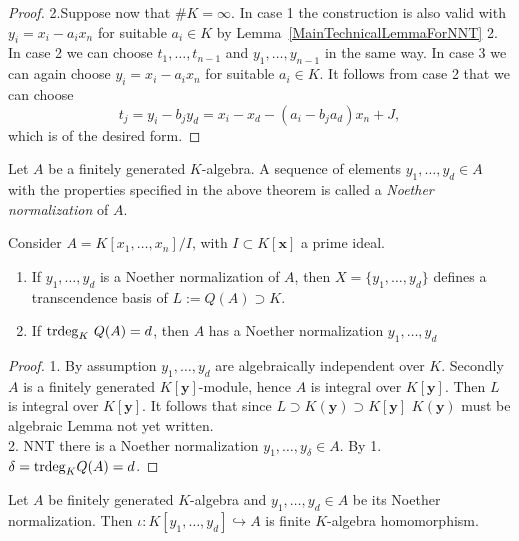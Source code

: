 \begin{proof}
        \noindent 2.Suppose now that $\#K=\infty$. In case 1 the construction is also valid with $y_i =x_i-a_ix_n$ for suitable $a_i\in K$ by Lemma~\ref{MainTechnicalLemmaForNNT} 2.\\ 
        In case 2 we can choose $t_1,\dots, t_{n-1}$ and $y_1,\dots, y_{n-1}$ in the same way. In case 3 we can again choose $y_i = x_i-a_ix_n$ for suitable $a_i\in K$. It follows from case 2 that we can choose $$t_j = y_i-b_jy_d = x_i-x_d-(a_i-b_ja_d)x_n + J,$$ which is of the desired form.  
    \end{proof}
    \begin{definition}
        Let $A$ be a finitely generated $K$-algebra. A sequence of elements $y_1,\dots,y_d \in A$ with the properties specified in the above theorem is called a \textit{Noether normalization} of $A$. 
    \end{definition}
    \begin{corollary}\label{FinitelyGeneratedFieldAlgebrasHaveFiniteTranscendenceDegree}
        Consider $A = K[x_1,\dots,x_n]/I$, with $I\subset K[\mathbf{x}]$ a prime ideal.
        \begin{enumerate}
            \item  If $y_1,\dots,y_d$ is a Noether normalization of $A$, then $X=\{y_1,\dots, y_d\}$ defines a transcendence basis of $L:=Q(A)\supset K$.
            \item If $\mathrm{trdeg }_K\ Q(A)=d$, then $A$ has a Noether normalization $y_1,\dots, y_d$
        \end{enumerate} 
    \end{corollary}
    \begin{proof}
        1. By assumption $y_1,\dots,y_d$ are algebraically independent over $K$. Secondly $A$ is a finitely generated $K[\mathbf{y}]$-module, hence $A$ is integral over $K[\mathbf{y}]$. Then $L$ is integral over $K[\mathbf{y}]$. It follows that since $L\supset K(\mathbf{y})\supset K[\mathbf{y}]$ $K(\mathbf{y})$ must be algebraic {\LARGE Lemma not yet written}.\\
        2. NNT there is a Noether normalization $y_1,\dots,y_\delta \in A$. By 1. $\delta = \mathrm{trdeg }_K Q(A) = d$.
    \end{proof}
    \begin{corollary}\label{NoetherNormalizationGivesRiseToFiniteAlgebraHomomorphism}
        Let $A$ be finitely generated $K$-algebra and $y_1,\dots,y_d\in A$ be its Noether normalization. Then $\iota : K[y_1,\dots,y_d]\hookrightarrow A$ is finite $K$-algebra homomorphism.
    \end{corollary}